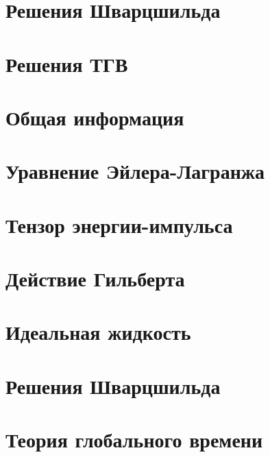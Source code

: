 \documentclass[12pt,a4paper]{article}
\providecommand{\docroot}{../..}
\begin{document}
    \section{Решения Шварцшильда}
    

    \section{Решения ТГВ}
    

    \begin{appendix}

        \section{Общая информация}
        

        \section{Уравнение Эйлера-Лагранжа}
        

        \section{Тензор энергии-импульса}
        

        \section{Действие Гильберта}
        

        \section{Идеальная жидкость}
        

        \section{Решения Шварцшильда}
        

        \section{Теория глобального времени}
        

    \end{appendix}

    \clearpage

    
    
\end{document}
